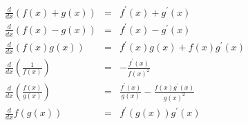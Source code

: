 \documentclass[justified,sixbynine]{tufte-book}
\theoremstyle{plain}%
\theoremstyle{definition}
\theoremstyle{remark}
\begin{document}
\begin{fullwidth}
\begin{eqnarray}
\frac d{dx}\left( f(x)+g(x)\right) &=&f^{\prime }(x)+g^{\prime }(x) \\
\frac d{dx}\left( f(x)-g(x)\right) &=&f^{\prime }(x)-g^{\prime }(x) \\
\frac d{dx}\left( f(x)g(x)\right) &=&f^{\prime }(x)g(x)+f(x)g^{\prime }(x) \\
\frac d{dx}\left( \frac 1{f(x)}\right) &=&-\frac{f^{\prime }(x)}{f(x)^2} \\
\frac d{dx}\left( \frac{f(x)}{g(x)}\right) &=&\frac{f^{\prime }(x)}{g(x)}-%
\frac{f(x)g^{\prime }(x)}{g(x)^2} \\
\frac d{dx}f(g(x)) &=&f^{\prime }(g(x))g^{\prime }(x)
\end{eqnarray}

\end{fullwidth}
\backmatter

\printindex
\end{document}
